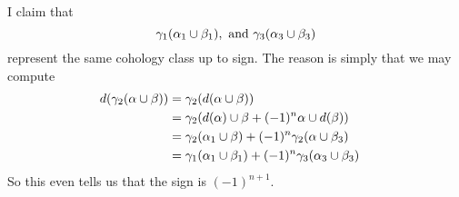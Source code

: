 \noindent
I claim that
$$
\gamma_1( \alpha_1 \cup \beta_1),\ \hbox{and}\ 
\gamma_3( \alpha_3 \cup \beta_3)
$$
represent the same cohology class up to sign.
The reason is simply that we may compute
\begin{align*}
d( \gamma_2(\alpha \cup \beta) )
& =
\gamma_2( d( \alpha \cup \beta) )
\cr
& =
\gamma_2( d(\alpha) \cup \beta + (-1)^n \alpha \cup d(\beta) )
\cr
& =
\gamma_2( \alpha_1 \cup \beta)  + (-1)^n \gamma_2( \alpha \cup \beta_3)
\cr
& =
\gamma_1( \alpha_1 \cup \beta_1) + (-1)^n \gamma_3( \alpha_3 \cup \beta_3)
\end{align*}
So this even tells us that the sign is $(-1)^{n+1}$.












